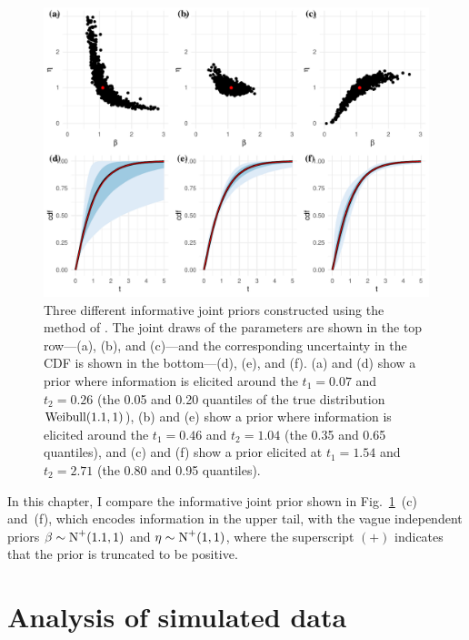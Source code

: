 \begin{figure}
    \centering
    \includegraphics[width=1\textwidth]{./figures/ch-2/joint-priors.pdf}
    \caption{Three different informative joint priors constructed using the method of \citet{kaminskiy2005}. The joint draws of the parameters are shown in the top row---(a), (b), and (c)---and the corresponding uncertainty in the CDF is shown in the bottom---(d), (e), and (f). (a) and (d) show a prior where information is elicited around the $t_1 = 0.07$ and $t_2 = 0.26$ (the 0.05 and 0.20 quantiles of the true distribution $\hbox{Weibull}(1.1, 1)$), (b) and (e) show a prior where information is elicited around the $t_1 = 0.46$ and $t_2 = 1.04$ (the 0.35 and 0.65 quantiles), and (c) and (f) show a prior elicited at $t_1 = 1.54$ and $t_2 = 2.71$ (the 0.80 and 0.95 quantiles).}
    \label{fig:kaminskiy-join-priors}
\end{figure}

In this chapter, I compare the informative joint prior shown in Fig.~\ref{fig:kaminskiy-join-priors}~(c) and~(f), which encodes information in the upper tail, with the vague independent priors $\beta \sim \hbox{N}^{+}(1.1, 1)$ and $\eta \sim \hbox{N}^{+}(1, 1)$, where the superscript $(+)$ indicates that the prior is truncated to be positive. 

\section{Analysis of simulated data} \label{sec:weibull-sim-example}

